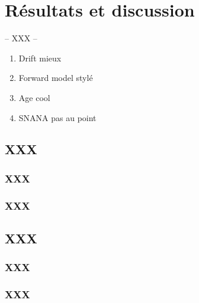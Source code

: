 \documentclass[../main/main.tex]{subfiles}
\begin{document}
\chapter{Résultats et discussion}\label{ch:res}

-- XXX --

\minitoc
\begin{enumerate}
    \item Drift mieux
    \item Forward model stylé
    \item Age cool
    \item SNANA pas au point
\end{enumerate}
\newpage

\section{XXX}

\subsection{XXX}

\subsection{XXX}


\section{XXX}

\subsection{XXX}

\subsection{XXX}
\end{document}
